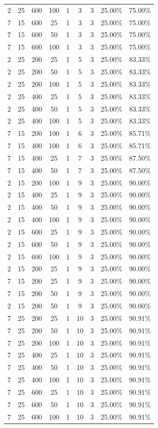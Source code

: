 {\begin{longtable}{| c | c | c | c | c | c | c | c | c |}
2&25&600&100&1&3&3&25.00\%&75.00\%\\
7&15&600&25&1&3&3&25.00\%&75.00\%\\
7&15&600&50&1&3&3&25.00\%&75.00\%\\
7&15&600&100&1&3&3&25.00\%&75.00\%\\
2&25&200&25&1&5&3&25.00\%&83.33\%\\
2&25&200&50&1&5&3&25.00\%&83.33\%\\
2&25&200&100&1&5&3&25.00\%&83.33\%\\
2&25&400&25&1&5&3&25.00\%&83.33\%\\
2&25&400&50&1&5&3&25.00\%&83.33\%\\
2&25&400&100&1&5&3&25.00\%&83.33\%\\
7&15&200&100&1&6&3&25.00\%&85.71\%\\
7&15&400&100&1&6&3&25.00\%&85.71\%\\
7&15&400&25&1&7&3&25.00\%&87.50\%\\
7&15&400&50&1&7&3&25.00\%&87.50\%\\
2&15&200&100&1&9&3&25.00\%&90.00\%\\
2&15&400&25&1&9&3&25.00\%&90.00\%\\
2&15&400&50&1&9&3&25.00\%&90.00\%\\
2&15&400&100&1&9&3&25.00\%&90.00\%\\
2&15&600&25&1&9&3&25.00\%&90.00\%\\
2&15&600&50&1&9&3&25.00\%&90.00\%\\
2&15&600&100&1&9&3&25.00\%&90.00\%\\
2&15&200&25&1&9&3&25.00\%&90.00\%\\
7&15&200&25&1&9&3&25.00\%&90.00\%\\
7&15&200&50&1&9&3&25.00\%&90.00\%\\
2&15&200&50&1&9&3&25.00\%&90.00\%\\
7&25&200&25&1&10&3&25.00\%&90.91\%\\
7&25&200&50&1&10&3&25.00\%&90.91\%\\
7&25&200&100&1&10&3&25.00\%&90.91\%\\
7&25&400&25&1&10&3&25.00\%&90.91\%\\
7&25&400&50&1&10&3&25.00\%&90.91\%\\
7&25&400&100&1&10&3&25.00\%&90.91\%\\
7&25&600&25&1&10&3&25.00\%&90.91\%\\
7&25&600&50&1&10&3&25.00\%&90.91\%\\
7&25&600&100&1&10&3&25.00\%&90.91\%\\

\end{longtable}}
